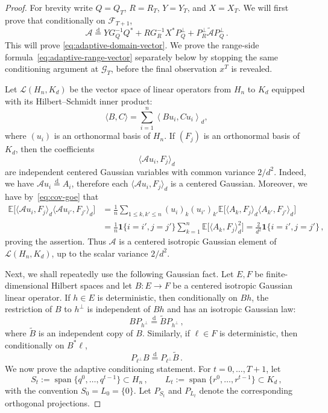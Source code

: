 \documentclass[10pt,a4paper]{amsart}
\newcommand{\E}{\mathbb E}
\newcommand{\cA}{\mathcal A}
\newcommand{\ip}[2]{\left\langle #1,#2\right\rangle}
\newcommand{\one}{\mathbf{1}}
\begin{document}
\begin{proof}
For brevity write $Q=Q_T$, $R=R_T$, $Y=Y_T$, and $X=X_T$. We will first prove that conditionally on $\mathscr F_{T+1}$,
\begin{equation}\label{eq:adaptive-conditioning}
  \mathcal A
  \stackrel{\mathrm d}{=}
  Y G_Q^{-1}Q^* + R G_R^{-1}X^*P_Q^\perp + P_R^\perp\widetilde{\mathcal A}P_Q^\perp\,.
\end{equation}
This will prove \eqref{eq:adaptive-domain-vector}.  We prove the range-side formula~\eqref{eq:adaptive-range-vector} separately below by stopping the same conditioning argument at $\mathscr G_T$, before the final observation $x^T$ is revealed.

Let $\mathscr L(H_n,K_d)$ be the vector space of linear operators from $H_n$ to $K_d$ equipped with its Hilbert--Schmidt inner product: 
\[\langle B, C\rangle = \sum_{i=1}^n \ip{Bu_i}{Cu_i}_{d},\]
where $(u_i)$ is an orthonormal basis of $H_n$.
If $(F_j)$ is an orthonormal basis of $K_d$, then the coefficients
\[
  \langle \mathcal A u_i,F_j\rangle_d
\]
are independent centered Gaussian variables with common variance $2/d^2$. Indeed, we have $\mathcal A u_i \stackrel{\mathrm d}{=} A_i$, therefore each $\langle \cA u_i,F_j\rangle_d$ is a centered Gaussian. Moreover, we have by~\eqref{eq:cov-goe} that
\begin{align*}
\E\big[ \langle \cA u_i, F_j \rangle_d \langle \cA u_{i'}, F_{j'} \rangle_d \big] &= \frac1n \sum_{1 \le k, k' \le n} (u_i)_k (u_{i'})_{k'} \E\big[ \langle A_k, F_j \rangle_d \langle A_{k'}, F_{j'} \rangle_d \big] \\
&= \frac1n \one\{i=i', j=j' \} \sum_{k=1}^n \E\big[ \langle A_k, F_j \rangle_d^2 \big] = \frac2{d^2} \one\{i=i', j=j' \}\,,
\end{align*}
proving the assertion. Thus $\cA$ is a centered isotropic Gaussian element of $\mathscr L(H_n,K_d)$, up to the scalar variance $2/d^2$.

Next, we shall repeatedly use the following Gaussian fact. Let $E,F$ be finite-dimensional Hilbert spaces and let $B:E\to F$ be a centered isotropic Gaussian linear operator. If $h\in E$ is deterministic, then conditionally on $Bh$, the restriction of $B$ to $h^\perp$ is independent of $Bh$ and has an isotropic Gaussian law:
\begin{equation}\label{eq:one-step-domain}
  BP_{h^\perp}
  \stackrel{\mathrm d}{=}
  \widetilde B P_{h^\perp}\,,
\end{equation}
where $\widetilde B$ is an independent copy of $B$. Similarly, if $\ell\in F$ is deterministic, then conditionally on $B^*\ell$, 
\begin{equation}\label{eq:one-step-range}
  P_{\ell^\perp}B
  \stackrel{\mathrm d}{=}
  P_{\ell^\perp}\widetilde B\,.
\end{equation}
%
We now prove the adaptive conditioning statement. For $t=0,\ldots,T+1$, let
\[
  S_t:=\operatorname{span}\{q^0,\ldots,q^{t-1}\}\subset H_n\,,
  \qquad
  L_t:=\operatorname{span}\{r^0,\ldots,r^{t-1}\}\subset K_d\,,
\]
with the convention $S_0=L_0=\{0\}$. Let $P_{S_t}$ and $P_{L_t}$ denote the corresponding orthogonal projections.


\end{proof}
\end{document}
